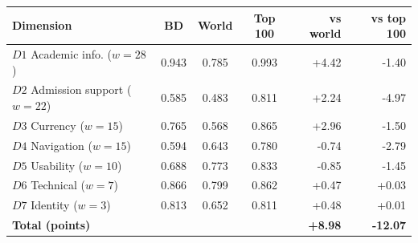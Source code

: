 \begin{tabular}{lcccrr}
\toprule
\textbf{Dimension} & \textbf{BD} & \textbf{World} & \textbf{Top 100} & \textbf{vs world} & \textbf{vs top 100} \\
\midrule
$D1$ Academic info. ($w=28$) & 0.943 & 0.785 & 0.993 & +4.42 & -1.40 \\
$D2$ Admission support ($w=22$) & 0.585 & 0.483 & 0.811 & +2.24 & -4.97 \\
$D3$ Currency ($w=15$) & 0.765 & 0.568 & 0.865 & +2.96 & -1.50 \\
$D4$ Navigation ($w=15$) & 0.594 & 0.643 & 0.780 & -0.74 & -2.79 \\
$D5$ Usability ($w=10$) & 0.688 & 0.773 & 0.833 & -0.85 & -1.45 \\
$D6$ Technical ($w=7$) & 0.866 & 0.799 & 0.862 & +0.47 & +0.03 \\
$D7$ Identity ($w=3$) & 0.813 & 0.652 & 0.811 & +0.48 & +0.01 \\
\midrule
\textbf{Total (points)} & & & & \textbf{+8.98} & \textbf{-12.07} \\
\bottomrule
\end{tabular}
